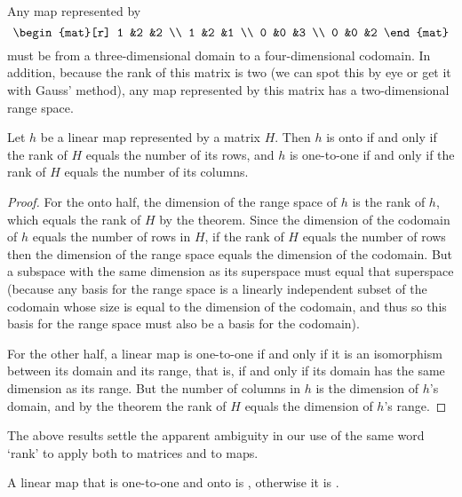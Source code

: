 \begin{example}
Any map represented by
\begin{equation*}
    \begin{mat}[r]
      1  &2  &2  \\
      1  &2  &1  \\
      0  &0  &3  \\
      0  &0  &2
    \end{mat}
\end{equation*}
must be from a three-dimensional domain
to a four-dimensional codomain.
In addition, because the rank of this matrix is two 
(we can spot this by eye or get it with Gauss' method),
any map represented by this matrix has a two-dimensional range space.
\end{example}

\begin{corollary} \label{cor:MatDescsMap}
Let $h$ be a linear map represented by a matrix $H$.
Then $h$ is onto if and only if the rank of $H$ equals the number 
of its rows, 
and $h$ is one-to-one if and only if the rank of $H$ equals the number of
its columns.
\end{corollary}

\begin{proof}
For the onto half, the dimension of the range space of $h$ is the rank of $h$,
which equals the rank of $H$ by the theorem.
Since the dimension of the codomain of $h$ equals the number of rows in $H$,
if the rank of $H$ equals the number of rows then the dimension of the
range space equals the dimension of the codomain.
But a subspace with the same dimension as its superspace must equal
that superspace
(because any basis for the range space is a linearly independent subset 
of the codomain
whose size is equal to the dimension of the codomain, and thus so this 
basis for the range space must also be 
a basis for the codomain).

For the other half, 
a linear map is one-to-one if and only if it is an isomorphism
between its domain and its range, that is, if and only if its domain has the
same dimension as its range.
But the number of columns in $h$ is the dimension of $h$'s domain, and
by the theorem the rank of $H$ equals the dimension of 
$h$'s range.
\end{proof}

The above results settle the apparent ambiguity in our use of the same
word `rank' to apply both to matrices and to maps.

\begin{definition}
A linear map that is one-to-one and onto is 
%
, otherwise it is 
%
.
\end{definition}

